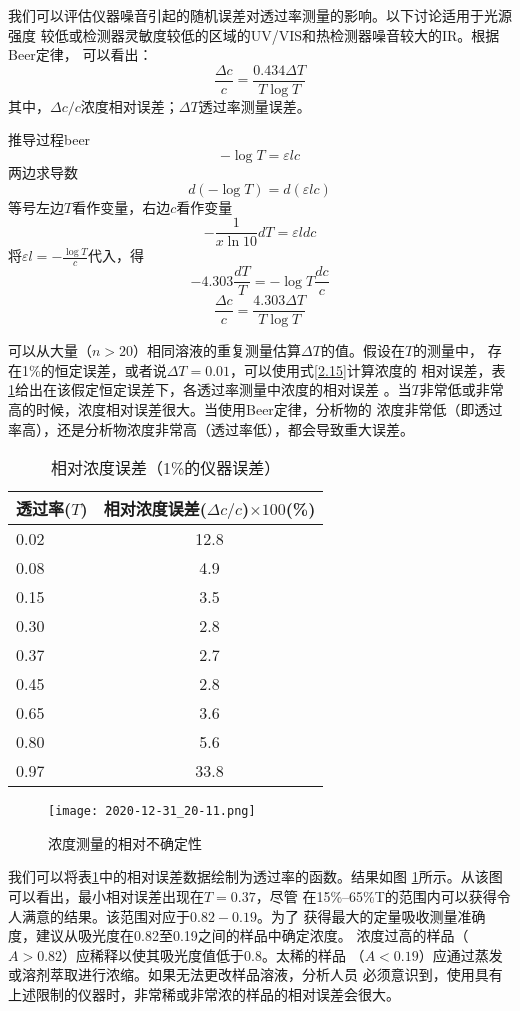 我们可以评估仪器噪音引起的随机误差对透过率测量的影响。以下讨论适用于光源强度
较低或检测器灵敏度较低的区域的UV/VIS和热检测器噪音较大的IR。根据Beer定律，
可以看出：
\begin{equation}
    \frac{\Delta c}{c} = \frac{0.434\Delta T}{T \log T}
    \label{2.15}
\end{equation}
其中，$\Delta c/c$浓度相对误差；$\Delta T$透过率测量误差。
\begin{definition}{推导过程}{beer}
\[
  -\log T = \varepsilon l c
\]
两边求导数
\[
  d(-\log T) = d(\varepsilon l c)
\]
等号左边$T$看作变量，右边$c$看作变量
\[
  -\frac{1}{x\ln 10}dT = \varepsilon l dc
\]
将$\varepsilon l = -\frac{\log T}{c}$代入，得
\[
  -4.303\frac{dT}{T} = -\log T \frac{dc}{c}
\]
\[
  \frac{\Delta c}{c} = \frac{4.303\Delta T}{T \log T}
\]
\end{definition}
可以从大量（$n>20$）相同溶液的重复测量估算$\Delta T$的值。假设在$T$的测量中，
存在1\%的恒定误差，或者说$\Delta T=0.01$，可以使用式\ref{2.15}计算浓度的
相对误差，表\ref{tab:2.9}给出在该假定恒定误差下，各透过率测量中浓度的相对误差
。当$T$非常低或非常高的时候，浓度相对误差很大。当使用Beer定律，分析物的
浓度非常低（即透过率高），还是分析物浓度非常高（透过率低），都会导致重大误差。
\begin{table}[htbp]
    \centering
    \caption{相对浓度误差（1\%的仪器误差）}
    \label{tab:2.9}
    \begin{tabular}{lc}
        \hline
        透过率($T$) & 相对浓度误差($\Delta c/c$)$\times 100$(\%)\\
        \hline
        0.02 & 12.8\\
        0.08 & 4.9 \\
        0.15 & 3.5 \\
        0.30 & 2.8 \\
        0.37 & 2.7 \\
        0.45 & 2.8 \\
        0.65 & 3.6 \\
        0.80 & 5.6 \\
        0.97 & 33.8\\
        \hline
    \end{tabular}
\end{table}
\begin{figure}[htpb]
    \centering
    \texttt{[image: 2020-12-31\_20-11.png]}
    \caption{浓度测量的相对不确定性}
    \label{fig:2.15}
\end{figure}

我们可以将表\ref{tab:2.9}中的相对误差数据绘制为透过率的函数。结果如图
\ref{fig:2.15}所示。从该图可以看出，最小相对误差出现在$T = 0.37$，尽管
在15\%--65\%T的范围内可以获得令人满意的结果。该范围对应$于0.82 - 0.19$。为了
获得最大的定量吸收测量准确度，建议从吸光度在0.82至0.19之间的样品中确定浓度。
浓度过高的样品（$A> 0.82$）应稀释以使其吸光度值低于0.8。太稀的样品
（$A < 0.19$）应通过蒸发或溶剂萃取进行浓缩。如果无法更改样品溶液，分析人员
必须意识到，使用具有上述限制的仪器时，非常稀或非常浓的样品的相对误差会很大。

